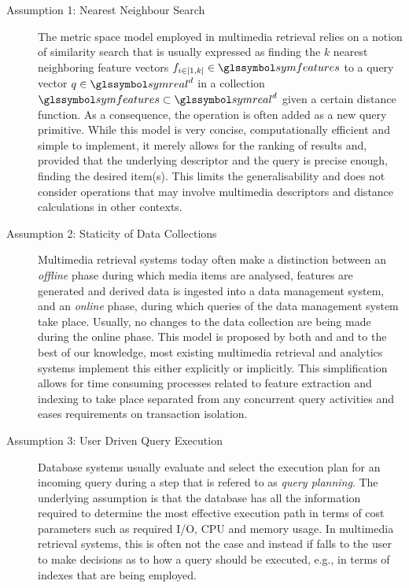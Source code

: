 \begin{description}
    \item[Assumption 1: Nearest Neighbour Search] The metric space model employed in multimedia retrieval \cite{Zezula:2006Similarity} relies on a notion of similarity search that is usually expressed as finding the $k$ nearest neighboring feature vectors $f_{i \in \left[1,k\right]} \in \symfeatures$ to a query vector $q \in \symreal^d$ in a collection $\symfeatures \subset \symreal^d$ given a certain distance function. As a consequence, the operation is often added as a new query primitive. While this model is very concise, computationally efficient and simple to implement, it merely allows for the ranking of results and, provided that the underlying descriptor and the query is precise enough, finding the desired item(s). This limits the generalisability and does not consider operations that may involve multimedia descriptors and distance calculations in other contexts.

    \item[Assumption 2: Staticity of Data Collections] Multimedia retrieval systems today often make a distinction between an \emph{offline} phase during which media items are analysed, features are generated and derived data is ingested into a data management system, and an \emph{online} phase, during which queries of the data management system take place. Usually, no changes to the data collection are being made during the online phase. This model is proposed by both \cite{Giangreco:2018Database} and \cite{Rossetto:2018thesis} and to the best of our knowledge, most existing multimedia retrieval and analytics systems implement this either explicitly or implicitly. This simplification allows for time consuming processes related to feature extraction and indexing to take place separated from any concurrent query activities and eases requirements on transaction isolation. 

    \item[Assumption 3: User Driven Query Execution] Database systems usually evaluate and select the execution plan for an incoming query during a step that is refered to as \emph{query planning}. The underlying assumption is that the database has all the information required to determine the most effective execution path in terms of cost parameters such as required I/O, CPU and memory usage. In multimedia retrieval systems, this is often not the case and instead if falls to the user to make decisions as to how a query should be executed, e.g., in terms of indexes that are being employed.
\end{description}

